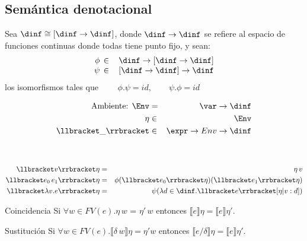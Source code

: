   \subsection{Semántica denotacional}
    \PN Sea $\dinf \cong [\dinf \to \dinf]$, donde $\dinf \rightarrow \dinf$ se refiere al espacio de funciones continuas donde todas tiene punto fijo, y sean:
      \[
        \begin{array}{rl}
        \phi \,\in\, & \dinf \to  [\dinf \to  \dinf]\\
        \psi \,\in\, & [\dinf \to  \dinf] \to  \dinf
        \end{array}
      \]
      los isomorfismos tales que $\qquad \phi . \psi = id, \qquad \psi . \phi = id$

      \begin{multicols}{2}
        \begin{eqnarray*}
          \text{Ambiente: } \Env &=& \var \to \dinf \\
          \eta &\in& \Env \\
          \llbracket\_\rrbracket &\in& \expr \to  Env \to  \dinf \\ \\
        \end{eqnarray*}
        \begin{eqnarray*}
          \\
          \llbracket v\rrbracket\eta &=& \eta\, v \\
          \llbracket e_0\, e_1\rrbracket\eta &=& \phi(\llbracket e_0\rrbracket \eta) (\llbracket e_1\rrbracket\eta) \\
          \llbracket\lambda v.e\rrbracket\eta &=& \psi(\lambda d \in \dinf. \llbracket e\rrbracket[\eta |v:d])
        \end{eqnarray*}        
      \end{multicols}
        
    \begin{theorem}{Coincidencia} Si $\forall w \in FV(e) . \eta\, w$ = $\eta'\, w$ entonces $\llbracket e\rrbracket \eta = \llbracket e\rrbracket \eta'$.
    \end{theorem}
        
    \begin{theorem}{Sustitución} Si $\forall w \in FV(e). \llbracket \delta\, w\rrbracket\eta = \eta' w$ entonces $\llbracket e/\delta\rrbracket \eta =\llbracket e\rrbracket\eta'$.
    \end{theorem}
    
